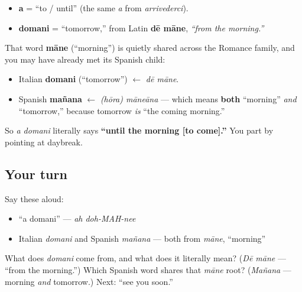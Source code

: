 \begin{cousinweb}
\begin{itemize}
\raggedright
  \item \textbf{a} = \textquotedblleft{}to / until\textquotedblright{} (the same \emph{a} from \emph{arrivederci}).
  \item \textbf{domani} = \textquotedblleft{}tomorrow,\textquotedblright{} from Latin \textbf{dē māne}, \emph{\textquotedblleft{}from the morning.\textquotedblright{}}
\end{itemize}

That word \textbf{māne} (\textquotedblleft{}morning\textquotedblright{}) is quietly shared across the Romance family, and you may have already met its Spanish child:

\begin{itemize}
\raggedright
  \item Italian \textbf{domani} (\textquotedblleft{}tomorrow\textquotedblright{}) $\leftarrow$ \emph{dē māne}.
  \item Spanish \textbf{mañana} $\leftarrow$ \emph{(hōra) māneāna} — which means \textbf{both} \textquotedblleft{}morning\textquotedblright{} \emph{and} \textquotedblleft{}tomorrow,\textquotedblright{} because tomorrow \emph{is} \textquotedblleft{}the coming morning.\textquotedblright{}
\end{itemize}

So \emph{a domani} literally says \textbf{\textquotedblleft{}until the morning {[}to come{]}.\textquotedblright{}} You part by pointing at daybreak.
\end{cousinweb}

\subsection*{Your turn}
Say these aloud:

\begin{itemize}
\raggedright
  \item \textquotedblleft{}a domani\textquotedblright{} — \emph{ah doh-MAH-nee}
  \item Italian \emph{domani} and Spanish \emph{mañana} — both from \emph{māne}, \textquotedblleft{}morning\textquotedblright{}
\end{itemize}

\begin{tcolorbox}[breakable,colback=teal!4,colframe=teal!35!black,title={Before you move on}]
What does \emph{domani} come from, and what does it literally mean? (\emph{Dē māne} — \textquotedblleft{}from the morning.\textquotedblright{}) Which Spanish word shares that \emph{māne} root? (\emph{Mañana} — morning \emph{and} tomorrow.) Next: \textquotedblleft{}see you soon.\textquotedblright{}
\end{tcolorbox}
